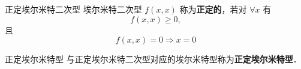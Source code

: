 \begin{definition}{正定埃尔米特二次型}
埃尔米特二次型 $f(   x,   x)$ 称为\textbf{正定的}，若对 $\forall    x$ 有
\begin{equation}
f(   x,   x)\geq0,
\end{equation}
且
\begin{equation}
f(   x,   x)=0\Rightarrow   x=   0
\end{equation}
\end{definition}
\begin{definition}{正定埃尔米特型}\label{HeFor_def1}
与正定埃尔米特二次型对应的埃尔米特型称为\textbf{正定埃尔米特型}．
\end{definition}